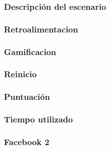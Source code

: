     \subsubsection{Descripción del escenario}
    \subsubsection{Retroalimentacion}
    \subsubsection{Gamificacion}
    \subsubsection{Reinicio}
    \subsubsection{Puntuación}
    \subsubsection{Tiempo utilizado}
    \subsubsection{Facebook 2}
